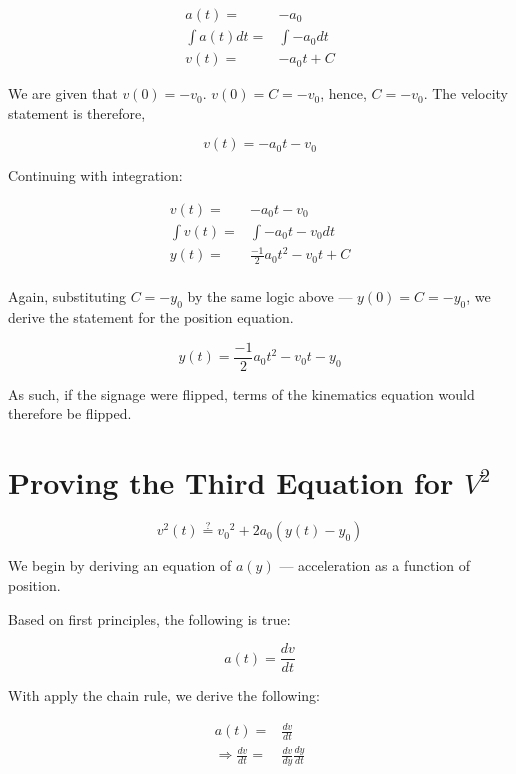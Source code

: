 \documentclass[letterpaper]{article}
\begin{document}
\begin{align}
    a(t) =& -a_0 \\
    \int a(t) dt =& \int -a_0 dt \\
    v(t) =& -a_0t + C 
\end{align}

We are given that \(v(0)=-v_0\). \(v(0) = C = -v_0\), hence, \(C=-v_0\). The velocity statement is therefore,

\begin{equation}
    v(t) = -a_0t-v_0
\end{equation}

Continuing with integration:

\begin{align}
    v(t) =& -a_0t - v_0 \\
    \int v(t) =& \int -a_0t - v_0 dt \\
    y(t) =& \frac{-1}{2}a_0t^2 - v_0t+C \\
\end{align}

Again, substituting \(C = -y_0\) by the same logic above --- \(y(0) = C = -y_0\), we derive the statement for the position equation.

\begin{equation}
    y(t) = \frac{-1}{2}a_0t^2 - v_0t - y_0
\end{equation}

As such, if the signage were flipped, terms of the kinematics equation would therefore be flipped.

\section{Proving the Third Equation for \(V^2\)}
\label{sec:orgea8e562}
\begin{equation}
    v^2(t) \stackrel{?}{=} {v_0}^2 + 2a_0(y(t)-y_0)
\end{equation}

We begin by deriving an equation of \(a(y)\) --- acceleration as a function of position.

Based on first principles, the following is true:

\begin{equation}
    a(t) = \frac{dv}{dt}
\end{equation}

With apply the chain rule, we derive the following:

\begin{align}
    a(t) =& \frac{dv}{dt} \\
    \Rightarrow \frac{dv}{dt} =& \frac{dv}{dy}\frac{dy}{dt} \\
\end{align}
\end{document}
